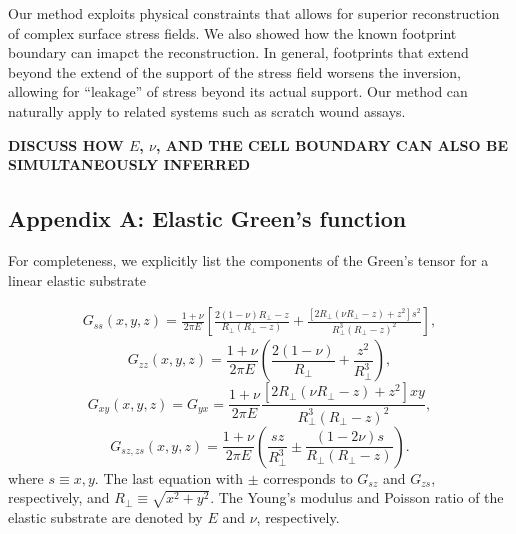 \documentclass[aps,prl,reprint,twocolumn,groupedaddress,showpacs]{revtex4-1}
\begin{document}
Our method exploits physical constraints that allows for superior
reconstruction of complex surface stress fields.  We also showed how
the known footprint boundary can imapct the reconstruction. In
general, footprints that extend beyond the extend of the support of
the stress field worsens the inversion, allowing for ``leakage'' of
stress beyond its actual support. Our method can naturally apply to
related systems such as scratch wound assays. 


\vspace{1cm}

{\bf DISCUSS HOW  $E$, $\nu$, AND THE CELL BOUNDARY CAN ALSO BE SIMULTANEOUSLY INFERRED}




\clearpage
\newpage 

\appendix
\begin{widetext}
\section{Appendix A: Elastic Green's function}

For completeness, we explicitly list the components of the Green's tensor 
for a linear elastic substrate \cite{LANDAU}

%
\begin{align}
G_{ss}(x,y,z) = \frac{1+\nu}{2\pi E}\left[\frac{2(1-\nu)R_{\perp}-z}{R_{\perp}(R_{\perp}-z)} + 
\frac{[2R_{\perp}(\nu R_{\perp}-z)+z^{2}]s^{2}}{R_{\perp}^{3}(R_{\perp}-z)^{2}}\right],
\end{align}
\begin{equation}
G_{zz}(x,y,z) =\frac{1+\nu}{2\pi E}\left(\frac{2(1-\nu)}
{R_{\perp}}+\frac{z^{2}}{R_{\perp}^{3}}\right),
\label{eq:Gzz0}
\end{equation}
\begin{equation} 
G_{xy}(x,y,z) = G_{yx}=\frac{1+\nu}{2\pi E}\frac{[2R_{\perp}(\nu R_{\perp}-z)+z^{2}]xy}{R_{\perp}^{3}
(R_{\perp}-z)^{2}},
\label{eq:Gxy0}
\end{equation}
\begin{equation}
G_{sz, zs}(x,y,z) =\frac{1+\nu}{2\pi E}\left(\frac{sz}{R_{\perp}^{3}}\pm\frac{(1-2\nu)s}{R_{\perp}
(R_{\perp}-z)}\right).
\end{equation}
%
where $s\equiv x,y$. The last equation with $\pm$ corresponds to
$G_{sz}$ and $G_{zs}$, respectively, and $R_{\perp} \equiv \sqrt{x^{2}
  +y^{2}}$. The Young's modulus and Poisson ratio of the elastic
substrate are denoted by $E$ and $\nu$, respectively.


\end{widetext}
\end{document}

